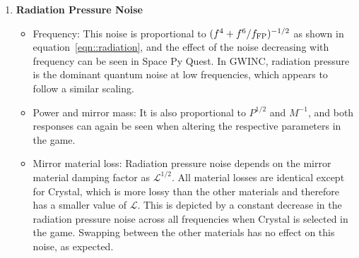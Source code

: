 \documentclass{article}
\begin{document}
\begin{enumerate}
    \item \textbf{Radiation Pressure Noise}
    \begin{itemize}
    \item Frequency: This noise is proportional to
      $(f^4+f^6/f_{\rm FP})^{-1/2}$ as shown in
      equation~\ref{eqn::radiation}, and the effect of the noise
      decreasing
      with frequency can be seen in Space Py Quest. In GWINC,
      radiation pressure is the dominant quantum noise at low
      frequencies, which appears to follow a similar scaling.  
\item Power and mirror mass: It is also proportional to $P^{1/2}$ and
  $M^{-1}$, and both responses can again be seen when altering the
  respective parameters in the game.
\item Mirror material loss: Radiation pressure noise depends on the
  mirror material damping factor as $\mathcal{L}^{1/2}$. All material
  losses are identical except for Crystal, which is more lossy than
  the other materials and therefore has a smaller value of
  $\mathcal{L}$. This is depicted by a constant decrease in the
  radiation pressure noise across all frequencies when Crystal is
  selected in the game. Swapping between the other materials has no
  effect on this noise, as expected.
\end{itemize}
    

\end{enumerate}
\end{document}
